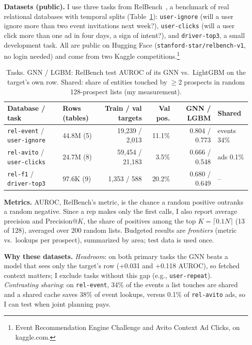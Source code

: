 \documentclass{article}
\begin{document}
\textbf{Datasets (public).} I use three tasks from RelBench~\cite{robinson2024relbench}, a benchmark of real relational databases with temporal splits (Table~\ref{tab:data}): \texttt{user-ignore} (will a user ignore more than two event invitations next week?), \texttt{user-clicks} (will a user click more than one ad in four days, a sign of intent?), and \texttt{driver-top3}, a small development task. All are public on Hugging Face (\texttt{stanford-star/relbench-v1}, no login needed) and come from two Kaggle competitions.\footnote{Event Recommendation Engine Challenge and Avito Context Ad Clicks, on kaggle.com.}

\begin{table}[t]
  \centering
  \small
  \begin{tabular}{@{}llrrrl@{}}
    \toprule
    Database / task & Rows (tables) & Train / val targets & Val pos. & GNN / LGBM & Shared \\
    \midrule
    \texttt{rel-event} / \texttt{user-ignore} & 44.8M (5) & 19,239 / 2,013 & 11.1\% & 0.804 / 0.773 & events 34\% \\
    \texttt{rel-avito} / \texttt{user-clicks} & 24.7M (8) & 59,454 / 21,183 & 3.5\% & 0.666 / 0.548 & ads 0.1\% \\
    \texttt{rel-f1} / \texttt{driver-top3} & 97.6K (9) & 1,353 / 588 & 20.2\% & 0.680 / 0.649 & -- \\
    \bottomrule
  \end{tabular}
  \caption{Tasks. GNN / LGBM: RelBench test AUROC of its GNN vs.\ LightGBM on the target's own row. Shared: share of entities touched by $\geq$2 prospects in random 128-prospect lists (my measurement).}
  \label{tab:data}
\end{table}

\textbf{Metrics.} AUROC, RelBench's metric, is the chance a random positive outranks a random negative. Since a rep makes only the first calls, I also report average precision and Precision@$K$, the share of positives among the top $K = \lceil 0.1N \rceil$ (13 of 128), averaged over 200 random lists. Budgeted results are \emph{frontiers} (metric vs.\ lookups per prospect), summarized by area; test data is used once.

\textbf{Why these datasets.} \emph{Headroom}: on both primary tasks the GNN beats a model that sees only the target's row (+0.031 and +0.118 AUROC), so fetched context matters; I exclude tasks without this gap (e.g., \texttt{user-repeat}). \emph{Contrasting sharing}: on \texttt{rel-event}, 34\% of the events a list touches are shared and a shared cache saves 38\% of event lookups, versus 0.1\% of \texttt{rel-avito} ads, so I can test when joint planning pays.
\end{document}
